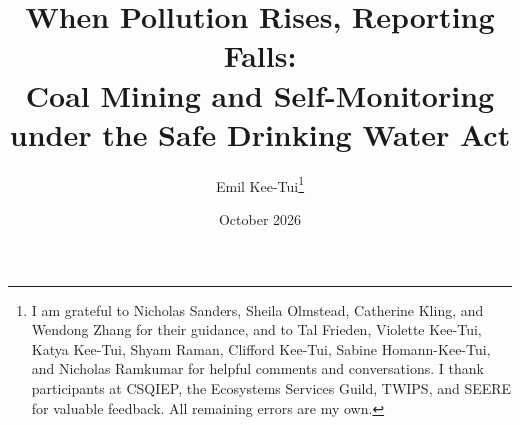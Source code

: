 \documentclass[12pt]{article}
\begin{document}
\title{When Pollution Rises, Reporting Falls:\\ Coal Mining and Self-Monitoring under the Safe Drinking Water Act}
\author{Emil Kee-Tui\thanks{%
I am grateful to Nicholas Sanders, Sheila Olmstead, Catherine Kling, and Wendong Zhang for their guidance, and to
Tal Frieden, Violette Kee-Tui, Katya Kee-Tui, Shyam Raman, Clifford Kee-Tui, Sabine Homann-Kee-Tui, and Nicholas Ramkumar for helpful comments and conversations. I thank participants at CSQIEP, the Ecosystems Services Guild, TWIPS, and SEERE for valuable feedback. All remaining errors are my own.}}
    
\date{October 2026}
\maketitle
\thispagestyle{empty}
\singlespacing
\end{document}
